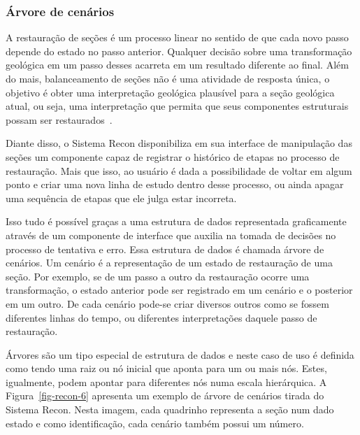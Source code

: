 \subsubsection{Árvore de cenários}

A restauração de seções é um processo linear no sentido de que cada novo passo depende do estado no passo anterior. Qualquer decisão sobre uma transformação geológica em um passo desses acarreta em um resultado diferente ao final. Além do mais, balanceamento de seções não é uma atividade de resposta única, o objetivo é obter uma interpretação geológica plausível para a seção geológica atual, ou seja, uma interpretação que permita que seus componentes estruturais possam ser restaurados~\cite{Fossen}. 

Diante disso, o Sistema Recon disponibiliza em sua interface de manipulação das seções um componente capaz de registrar o histórico de etapas no processo de restauração. Mais que isso, ao usuário é dada a possibilidade de voltar em algum ponto e criar uma nova linha de estudo dentro desse processo, ou ainda apagar uma sequência de etapas que ele julga estar incorreta.

Isso tudo é possível graças a uma estrutura de dados representada graficamente através de um componente de interface que auxilia na tomada de decisões no processo de tentativa e erro. Essa estrutura de dados é chamada árvore de cenários. Um cenário é a representação de um estado de restauração de uma seção. Por exemplo, se de um passo a outro da restauração ocorre uma transformação, o estado anterior pode ser registrado em um cenário e o posterior em um outro. De cada cenário pode-se criar diversos outros como se fossem diferentes linhas do tempo, ou diferentes interpretações daquele passo de restauração.

Árvores são um tipo especial de estrutura de dados e neste caso de uso é definida como tendo uma raiz ou nó inicial que aponta para um ou mais nós. Estes, igualmente, podem apontar para diferentes nós numa escala hierárquica. A Figura~\ref{fig-recon-6} apresenta um exemplo de árvore de cenários tirada do Sistema Recon. Nesta imagem, cada quadrinho representa a seção num dado estado e como identificação, cada cenário também possui um número.

